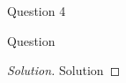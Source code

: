 \begin{solution}{Question 4}\label{ques:4}
    \begin{question}
    Question
    \end{question}
    \tcblower{}
    \begin{proof}[Solution]
        Solution
    \end{proof}
\end{solution}
